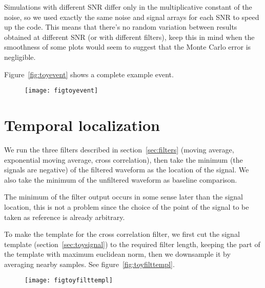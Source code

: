 Simulations with different SNR differ only in the multiplicative constant of
the noise, so we used exactly the same noise and signal arrays for each SNR to
speed up the code. This means that there's no random variation between results
obtained at different SNR (or with different filters), keep this in mind when
the smoothness of some plots would seem to suggest that the Monte Carlo error
is negligible.

Figure~\ref{fig:toyevent} shows a complete example event.

\begin{figure}
    \hspace{-0.15\textwidth}
    \texttt{[image: figtoyevent]}
    

\end{figure}

\section{Temporal localization}

We run the three filters described in section~\ref{sec:filters} (moving
average, exponential moving average, cross correlation), then take the minimum
(the signals are negative) of the filtered waveform as the location of the
signal. We also take the minimum of the unfiltered waveform as baseline
comparison.

The minimum of the filter output occurs in some sense later than the signal
location, this is not a problem since the choice of the point of the signal to
be taken as reference is already arbitrary.

To make the template for the cross correlation filter, we first cut the signal
template (section~\ref{sec:toysignal}) to the required filter length, keeping
the part of the template with maximum euclidean norm, then we downsample it by
averaging nearby samples. See figure~\ref{fig:toyfilttempl}.

\begin{figure}
    \hspace{0.00\textwidth}
    \texttt{[image: figtoyfilttempl]}
    

\end{figure}

